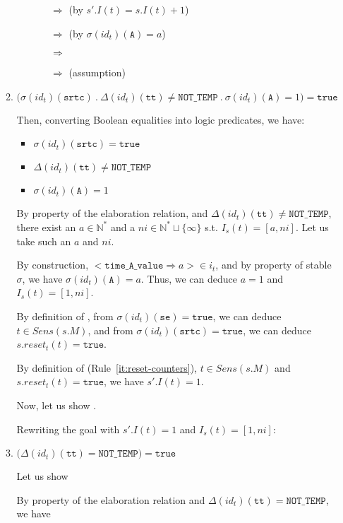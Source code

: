 \documentclass[dvipsnames,12pt]{article}
\begin{document}
\begin{niproof}
\begin{enumerate}
\begin{enumerate}
\begin{enumerate}
\begin{itemize}
          $\Rightarrow{}$  (by
          $s'.I(t)=s.I(t)+1$)

          $\Rightarrow{}$  (by
          $\sigma(id_t)(\texttt{A})=a$)
          
          $\Rightarrow{}$ 

          $\Rightarrow{}$  (assumption)
        \end{itemize}
      \end{enumerate}

    \item
      $\big(\sigma(id_t)(\texttt{srtc})~.~\Delta(id_t)(\texttt{tt})\neq\mathtt{NOT\_TEMP}~.~\sigma(id_t)(\texttt{A})=1\big)=\mathtt{true}$

      Then, converting Boolean equalities into logic predicates, we
      have:
      \begin{itemize}
      \item $\sigma(id_t)(\texttt{srtc})=\mathtt{true}$
      \item $\Delta(id_t)(\texttt{tt})\neq\mathtt{NOT\_TEMP}$
      \item $\sigma(id_t)(\texttt{A})=1$
      \end{itemize}

      By property of the elaboration relation, and
      $\Delta(id_t)(\texttt{tt})\neq\mathtt{NOT\_TEMP}$, there exist an
      $a\in\mathbb{N}^{*}$ and a $ni\in\mathbb{N}^{*}\sqcup\{\infty\}$
      s.t. $I_s(t)=[a,ni]$. Let us take such an $a$ and $ni$.

      By construction,
      ${<}\mathtt{time\_A\_value\Rightarrow}{}a{>}\in{}i_t$, and by
      property of stable $\sigma$, we have
      $\sigma(id_t)(\texttt{A})=a$. Thus, we can deduce $a=1$ and
      $I_s(t)=[1,ni]$.

      By definition of \upSim, from
      $\sigma(id_t)(\texttt{se})=\mathtt{true}$, we can deduce
      $t\in{}Sens(s.M)$, and from
      $\sigma(id_t)(\texttt{srtc})=\mathtt{true}$, we can deduce
      $s.reset_t(t)=\mathtt{true}$.

      By definition of \dwSitpn{} (Rule~\ref{it:reset-counters}),
      $t\in{}Sens(s.M)$ and $s.reset_t(t)=\mathtt{true}$, we have
      $s'.I(t)=1$.

      Now, let us show .

      Rewriting the goal with $s'.I(t)=1$ and $I_s(t)=[1,ni]$:
    \item
      $\big(\Delta(id_t)(\texttt{tt})=\mathtt{NOT\_TEMP}\big)=\mathtt{true}$

      Let us show 
      
      By property of the elaboration relation and
      $\Delta(id_t)(\texttt{tt})=\mathtt{NOT\_TEMP}$, we have
    \end{enumerate}
  \end{enumerate}
\end{niproof}
\end{document}
